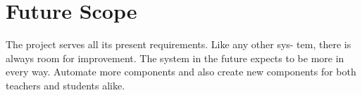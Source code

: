 \chapter{Future Scope}

The project serves all its present requirements. Like any other sys- tem, there is always room for improvement.
The  system in the future expects to be more in every way. Automate more components and also create new components for both teachers and students alike.
